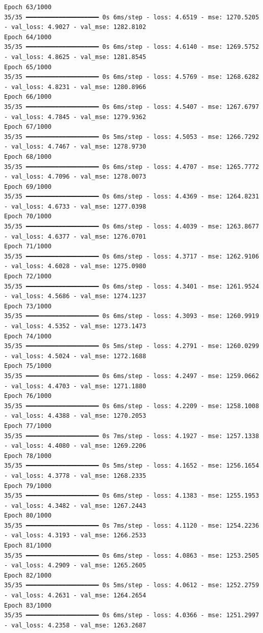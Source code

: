 \documentclass[
  letterpaper,
  DIV=11,
  numbers=noendperiod]{scrreprt}
\begin{document}
\begin{verbatim}
Epoch 63/1000
35/35 ━━━━━━━━━━━━━━━━━━━━ 0s 6ms/step - loss: 4.6519 - mse: 1270.5205 - val_loss: 4.9027 - val_mse: 1282.8102
Epoch 64/1000
35/35 ━━━━━━━━━━━━━━━━━━━━ 0s 6ms/step - loss: 4.6140 - mse: 1269.5752 - val_loss: 4.8625 - val_mse: 1281.8545
Epoch 65/1000
35/35 ━━━━━━━━━━━━━━━━━━━━ 0s 6ms/step - loss: 4.5769 - mse: 1268.6282 - val_loss: 4.8231 - val_mse: 1280.8966
Epoch 66/1000
35/35 ━━━━━━━━━━━━━━━━━━━━ 0s 6ms/step - loss: 4.5407 - mse: 1267.6797 - val_loss: 4.7845 - val_mse: 1279.9362
Epoch 67/1000
35/35 ━━━━━━━━━━━━━━━━━━━━ 0s 5ms/step - loss: 4.5053 - mse: 1266.7292 - val_loss: 4.7467 - val_mse: 1278.9730
Epoch 68/1000
35/35 ━━━━━━━━━━━━━━━━━━━━ 0s 6ms/step - loss: 4.4707 - mse: 1265.7772 - val_loss: 4.7096 - val_mse: 1278.0073
Epoch 69/1000
35/35 ━━━━━━━━━━━━━━━━━━━━ 0s 6ms/step - loss: 4.4369 - mse: 1264.8231 - val_loss: 4.6733 - val_mse: 1277.0398
Epoch 70/1000
35/35 ━━━━━━━━━━━━━━━━━━━━ 0s 6ms/step - loss: 4.4039 - mse: 1263.8677 - val_loss: 4.6377 - val_mse: 1276.0701
Epoch 71/1000
35/35 ━━━━━━━━━━━━━━━━━━━━ 0s 6ms/step - loss: 4.3717 - mse: 1262.9106 - val_loss: 4.6028 - val_mse: 1275.0980
Epoch 72/1000
35/35 ━━━━━━━━━━━━━━━━━━━━ 0s 6ms/step - loss: 4.3401 - mse: 1261.9524 - val_loss: 4.5686 - val_mse: 1274.1237
Epoch 73/1000
35/35 ━━━━━━━━━━━━━━━━━━━━ 0s 6ms/step - loss: 4.3093 - mse: 1260.9919 - val_loss: 4.5352 - val_mse: 1273.1473
Epoch 74/1000
35/35 ━━━━━━━━━━━━━━━━━━━━ 0s 5ms/step - loss: 4.2791 - mse: 1260.0299 - val_loss: 4.5024 - val_mse: 1272.1688
Epoch 75/1000
35/35 ━━━━━━━━━━━━━━━━━━━━ 0s 6ms/step - loss: 4.2497 - mse: 1259.0662 - val_loss: 4.4703 - val_mse: 1271.1880
Epoch 76/1000
35/35 ━━━━━━━━━━━━━━━━━━━━ 0s 6ms/step - loss: 4.2209 - mse: 1258.1008 - val_loss: 4.4388 - val_mse: 1270.2053
Epoch 77/1000
35/35 ━━━━━━━━━━━━━━━━━━━━ 0s 7ms/step - loss: 4.1927 - mse: 1257.1338 - val_loss: 4.4080 - val_mse: 1269.2206
Epoch 78/1000
35/35 ━━━━━━━━━━━━━━━━━━━━ 0s 5ms/step - loss: 4.1652 - mse: 1256.1654 - val_loss: 4.3778 - val_mse: 1268.2335
Epoch 79/1000
35/35 ━━━━━━━━━━━━━━━━━━━━ 0s 6ms/step - loss: 4.1383 - mse: 1255.1953 - val_loss: 4.3482 - val_mse: 1267.2443
Epoch 80/1000
35/35 ━━━━━━━━━━━━━━━━━━━━ 0s 7ms/step - loss: 4.1120 - mse: 1254.2236 - val_loss: 4.3193 - val_mse: 1266.2533
Epoch 81/1000
35/35 ━━━━━━━━━━━━━━━━━━━━ 0s 6ms/step - loss: 4.0863 - mse: 1253.2505 - val_loss: 4.2909 - val_mse: 1265.2605
Epoch 82/1000
35/35 ━━━━━━━━━━━━━━━━━━━━ 0s 5ms/step - loss: 4.0612 - mse: 1252.2759 - val_loss: 4.2631 - val_mse: 1264.2654
Epoch 83/1000
35/35 ━━━━━━━━━━━━━━━━━━━━ 0s 6ms/step - loss: 4.0366 - mse: 1251.2997 - val_loss: 4.2358 - val_mse: 1263.2687

\end{verbatim}
\end{document}
